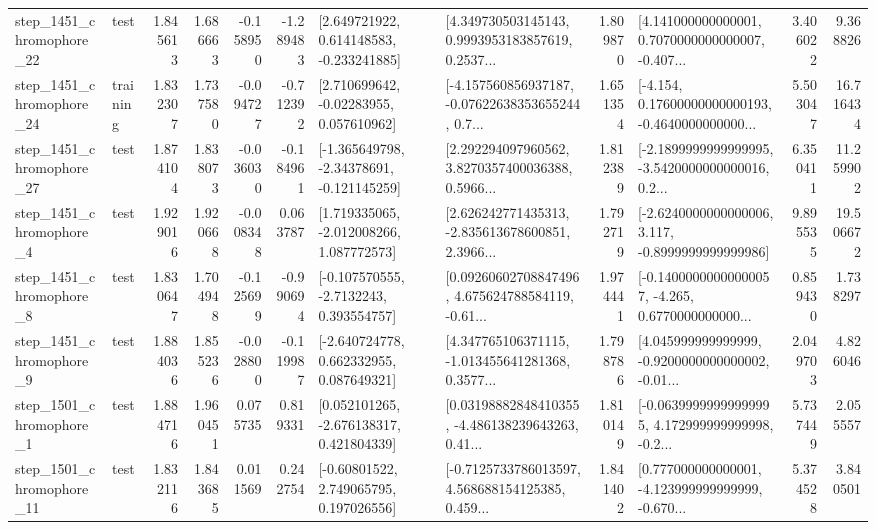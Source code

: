 \begin{tabular}{llrrrrllrlrr}
 step\_1451\_chromophore\_22 &      test &      1.845613 &    1.686663 &     -0.158950 & -1.289483 &    [2.649721922, 0.614148583, -0.233241885] &  [4.349730503145143, 0.9993953183857619, 0.2537... &       1.809870 &  [4.141000000000001, 0.7070000000000007, -0.407... &            3.406022 &          9.368826 \\
 step\_1451\_chromophore\_24 &  training &      1.832307 &    1.737580 &     -0.094727 & -0.712392 &     [2.710699642, -0.02283955, 0.057610962] &  [-4.157560856937187, -0.07622638353655244, 0.7... &       1.651354 &  [-4.154, 0.17600000000000193, -0.4640000000000... &            5.503047 &         16.716434 \\
 step\_1451\_chromophore\_27 &      test &      1.874104 &    1.838073 &     -0.036030 & -0.184961 &   [-1.365649798, -2.34378691, -0.121145259] &  [2.292294097960562, 3.8270357400036388, 0.5966... &       1.812389 &  [-2.1899999999999995, -3.5420000000000016, 0.2... &            6.350411 &         11.259902 \\
  step\_1451\_chromophore\_4 &      test &      1.929016 &    1.920668 &     -0.008348 &  0.063787 &    [1.719335065, -2.012008266, 1.087772573] &  [2.626242771435313, -2.835613678600851, 2.3966... &       1.792719 &  [-2.6240000000000006, 3.117, -0.8999999999999986] &            9.895535 &         19.506672 \\
  step\_1451\_chromophore\_8 &      test &      1.830647 &    1.704948 &     -0.125699 & -0.990694 &     [-0.107570555, -2.7132243, 0.393554757] &  [0.09260602708847496, 4.675624788584119, -0.61... &       1.974441 &  [-0.14000000000000057, -4.265, 0.6770000000000... &            0.859430 &          1.738297 \\
  step\_1451\_chromophore\_9 &      test &      1.884036 &    1.855236 &     -0.028800 & -0.119987 &    [-2.640724778, 0.662332955, 0.087649321] &  [4.347765106371115, -1.013455641281368, 0.3577... &       1.798786 &  [4.045999999999999, -0.9200000000000002, -0.01... &            2.049703 &          4.826046 \\
  step\_1501\_chromophore\_1 &      test &      1.884716 &    1.960451 &      0.075735 &  0.819331 &    [0.052101265, -2.676138317, 0.421804339] &  [0.03198882848410355, -4.486138239643263, 0.41... &       1.810149 &  [-0.06399999999999995, 4.172999999999998, -0.2... &            5.737449 &          2.055557 \\
 step\_1501\_chromophore\_11 &      test &      1.832116 &    1.843685 &      0.011569 &  0.242754 &     [-0.60801522, 2.749065795, 0.197026556] &  [-0.7125733786013597, 4.568688154125385, 0.459... &       1.841402 &  [0.777000000000001, -4.123999999999999, -0.670... &            5.374528 &          3.840501 \\

\end{tabular}
